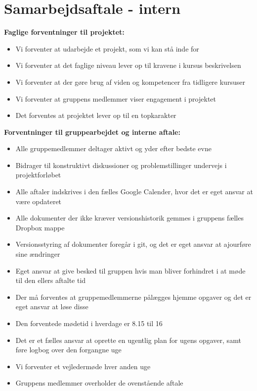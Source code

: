 \section{Samarbejdsaftale - intern}\label{title:samarbejdsaftaleIntern}

\textbf{Faglige forventninger til projektet:}
\begin{itemize}
	\item Vi forventer at udarbejde et projekt, som vi kan stå inde for
	\item Vi forventer at det faglige niveau lever op til kravene i kursus beskrivelsen
	\item Vi forventer at der gøre brug af viden og kompetencer fra tidligere kursuser
	\item Vi forventer at gruppens medlemmer viser engagement i projektet
	\item Det forventes at projektet lever op til en topkarakter
\end{itemize}

\textbf{Forventninger til gruppearbejdet og interne aftale:}
\begin{itemize}
	\item Alle gruppemedlemmer deltager aktivt og yder efter bedste evne
	\item Bidrager til konstruktivt diskussioner og problemstillinger undervejs i projektforløbet
	\item Alle aftaler indskrives i den fælles Google Calender, hvor det er eget ansvar at være opdateret
	\item Alle dokumenter der ikke kræver versionshistorik gemmes i gruppens fælles Dropbox mappe
	\item Versionsstyring af dokumenter foregår i git, og det er eget ansvar at ajourføre sine ændringer
	\item Eget ansvar at give besked til gruppen hvis man bliver forhindret i at møde til den ellers aftalte tid
	\item Der må forventes at gruppemedlemmerne pålægges hjemme opgaver og det er eget ansvar at løse disse
	\item Den forventede mødetid i hverdage er 8.15 til 16
	\item Det er et fælles ansvar at oprette en ugentlig plan for ugens opgaver, samt føre logbog over den forgangne uge	
	\item Vi forventer et vejledermøde hver anden uge
	\item Gruppens medlemmer overholder de ovenstående aftale
\end{itemize}

